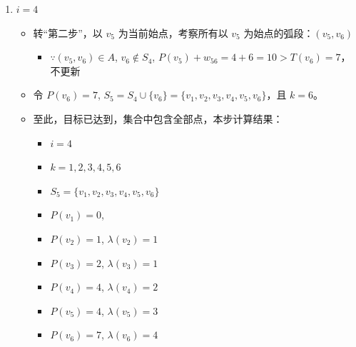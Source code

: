 \begin{enumerate}[label=(\arabic*)]
    \item \( i = 4 \)
    \begin{itemize}
        \item 转“第二步”，以 \( v_5 \) 为当前始点，考察所有以 \( v_5 \) 为始点的弧段：\( (v_5, v_6) \)
        \begin{itemize}
            \item \(\because (v_5, v_6) \in A\), \( v_6 \notin S_4 \), \( P(v_5) + w_{56} = 4 + 6 = 10 > T(v_6) = 7 \)，不更新
        \end{itemize}
        \item 令 \( P(v_6) = 7 \), \( S_5 = S_4 \cup \{v_6\} = \{v_1, v_2, v_3, v_4, v_5,v_6\} \)，且 \( k = 6 \)。
        \item 至此，目标已达到，集合中包含全部点，本步计算结果：
        \begin{itemize}
            \item \( i = 4 \)
            \item \( k = 1, 2, 3, 4, 5, 6 \)
            \item \( S_5 = \{v_1, v_2, v_3, v_4, v_5, v_6\} \)
            \item \( P(v_1) = 0 \),
            \item \( P(v_2) = 1 \), \( \lambda(v_2) = 1 \)
            \item \( P(v_3) = 2 \), \( \lambda(v_3) = 1 \)
            \item \( P(v_4) = 4 \), \( \lambda(v_4) = 2 \)
            \item \( P(v_5) = 4 \), \( \lambda(v_5) = 3 \)
            \item \( P(v_6) = 7 \), \( \lambda(v_6) = 4 \)
        \end{itemize}
    \end{itemize}
    


\end{enumerate}
